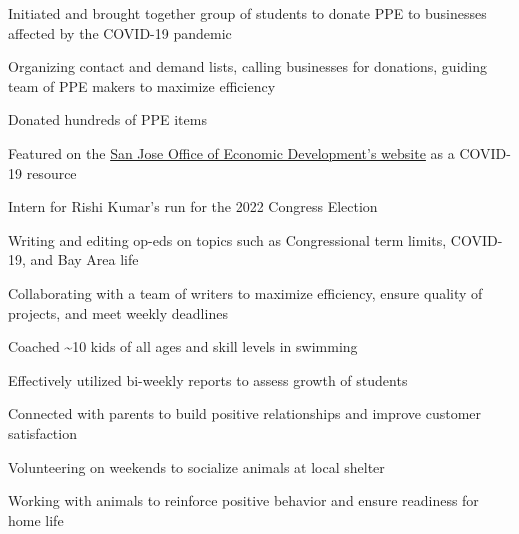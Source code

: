 \documentclass[letterpaper]{resume-shreeram}
\begin{document}
\begin{compactitem}
    \item Initiated and brought together group of students to donate PPE
      to businesses affected by the COVID-19 pandemic

    \item Organizing contact and demand lists, calling businesses for
      donations, guiding team of PPE makers to maximize efficiency

    \item Donated hundreds of PPE items

    \item Featured on the
      \href{https://www.sjeconomy.com/why-san-jose/covid-19-guidance/local-suppliers}{San
      Jose Office of Economic Development's website} as a COVID-19
      resource
\end{compactitem}

\begin{compactitem}
    \item Intern for Rishi Kumar's run for the 2022 Congress Election

    \item Writing and editing op-eds on topics such as Congressional
      term limits, COVID-19, and Bay Area life

    \item Collaborating with a team of writers to maximize efficiency,
      ensure quality of projects, and meet weekly deadlines
\end{compactitem}

\begin{compactitem}
    \item Coached \textasciitilde{}10 kids of all ages and skill levels
      in swimming

    \item Effectively utilized bi-weekly reports to assess growth of
      students

    \item Connected with parents to build positive relationships and
      improve customer satisfaction
\end{compactitem}

\begin{compactitem}
  \item Volunteering on weekends to socialize animals at local shelter

  \item Working with animals to reinforce positive behavior and ensure
    readiness for home life
\end{compactitem}
\end{document}
